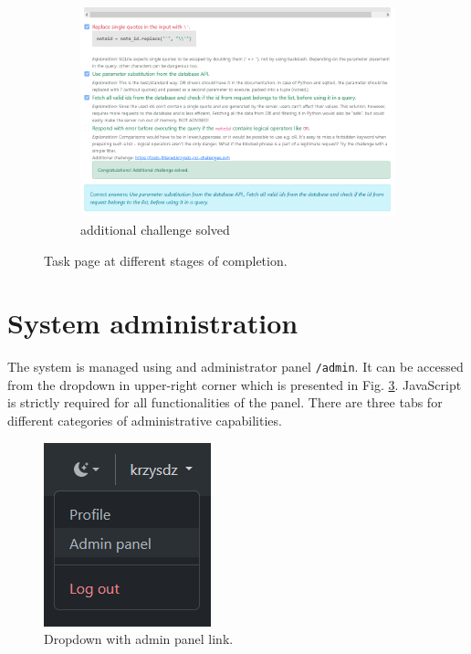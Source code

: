 \begin{figure}
    \begin{subfigure}{0.7\textwidth}
        \includegraphics[width=\textwidth]{img/manual-task-complete.png}
        \caption{additional challenge solved}
        \label{fig:manual-task-complete}
    \end{subfigure}
    \caption{Task page at different stages of completion.}
    \label{fig:manual-task}
\end{figure}

\section{System administration}
\label{chap:system-administration}

The system is managed using and administrator panel \texttt{/admin}. It can be accessed from the dropdown in upper-right corner which is presented in Fig. \ref{fig:manual-admin-dropdown}. JavaScript is strictly required for all functionalities of the panel. There are three tabs for different categories of administrative capabilities.

\begin{figure}
    \centering
    \includegraphics{img/manual-admin-dropdown.png}
    \caption{Dropdown with admin panel link.}
    \label{fig:manual-admin-dropdown}
\end{figure}

